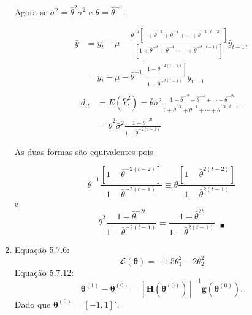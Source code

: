 \begin{enumerate}
	Agora se $\sigma^2=\bar{\theta}^2\bar{\sigma}^2$ e $\theta=\bar{\theta}^{-1}$:
	
		\begin{align*}
	\bar{y}&=y_t-\mu-\frac{\bar{\theta}^{-1}[1+\bar{\theta}^{-2}+\bar{\theta}^{-4}+\cdots+\bar{\theta}^{-2(t-2)}]}{[1+\bar{\theta}^{-2}+\bar{\theta}^{-4}+\cdots+\bar{\theta}^{-2(t-1)}]}\bar{y}_{t-1},\\
	&=y_t-\mu-\bar{\theta}^{-1}\frac{[1-\bar{\theta}^{-2(t-2)}]}{1-\bar{\theta}^{-2(t-1)}}\bar{y}_{t-1}\\
	\end{align*}
	\begin{align*}
	d_{tt}&=E(\bar{Y}_t^2)=\bar{\theta}\bar{\sigma}^2\frac{1+\bar{\theta}^{-2}+\bar{\theta}^{-4}+\cdots+\bar{\theta}^{-2t}}{1+\bar{\theta}^{-2}+\bar{\theta}^{-4}+\cdots+\bar{\theta}^{-2(t-1)}}\\
	&=\bar{\theta}^2\bar{\sigma}^2\frac{1-\bar{\theta}^{-2t}}{1-\bar{\theta}^{-2(t-1)}}
	\end{align*}
	
	As duas formas são equivalentes pois
	
	$$\bar{\theta}^{-1}\frac{[1-\bar{\theta}^{-2(t-2)}]}{1-\bar{\theta}^{-2(t-1)}}\equiv \bar{\theta}\frac{[1-\bar{\theta}^{2(t-2)}]}{1-\bar{\theta}^{2(t-1)}}$$
	e
	$$\bar{\theta}^2\frac{1-\bar{\theta}^{-2t}}{1-\bar{\theta}^{-2(t-1)}}\equiv \frac{1-\bar{\theta}^{2t}}{1-\bar{\theta}^{2(t-1)}}\;\;_\blacksquare$$
	
	
	\item[\fbox{5.2}]
	
	
		Equação 5.7.6: $$\mathscr{L}(\boldsymbol{\theta}) = -1.5\theta_1^2-2\theta_2^2$$
		Equação 5.7.12: $$\boldsymbol{\theta}^{(1)}-\boldsymbol{\theta}^{(0)}=[\mathbf{H}(\boldsymbol{\theta}^{(0)})]^{-1}\mathbf{g}(\boldsymbol{\theta}^{(0)}).$$
		Dado que $\boldsymbol{\theta}^{(0)}=[-1,1]'$.
		

\end{enumerate}

